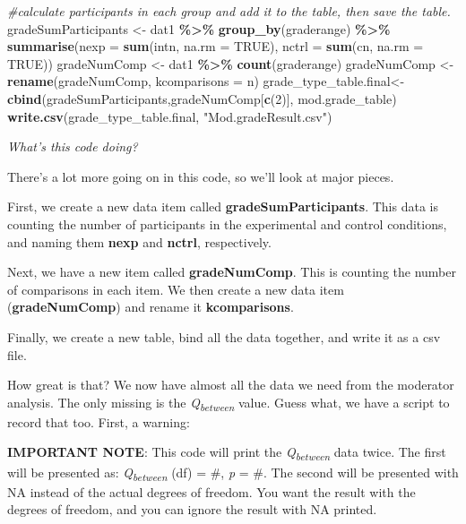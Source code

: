 \documentclass[
]{book}
\newenvironment{Shaded}{\begin{snugshade}}{\end{snugshade}}
\newcommand{\AttributeTok}[1]{\textcolor[rgb]{0.13,0.29,0.53}{#1}}
\newcommand{\CommentTok}[1]{\textcolor[rgb]{0.56,0.35,0.01}{\textit{#1}}}
\newcommand{\ConstantTok}[1]{\textcolor[rgb]{0.56,0.35,0.01}{#1}}
\newcommand{\DecValTok}[1]{\textcolor[rgb]{0.00,0.00,0.81}{#1}}
\newcommand{\FunctionTok}[1]{\textcolor[rgb]{0.13,0.29,0.53}{\textbf{#1}}}
\newcommand{\NormalTok}[1]{#1}
\newcommand{\OtherTok}[1]{\textcolor[rgb]{0.56,0.35,0.01}{#1}}
\newcommand{\SpecialCharTok}[1]{\textcolor[rgb]{0.81,0.36,0.00}{\textbf{#1}}}
\newcommand{\StringTok}[1]{\textcolor[rgb]{0.31,0.60,0.02}{#1}}
\begin{document}
\begin{Shaded}
\begin{Highlighting}[]
\CommentTok{\#calculate participants in each group and add it to the table, then save the table.}
\NormalTok{gradeSumParticipants }\OtherTok{\textless{}{-}}\NormalTok{ dat1 }\SpecialCharTok{\%\textgreater{}\%}
  \FunctionTok{group\_by}\NormalTok{(graderange) }\SpecialCharTok{\%\textgreater{}\%}
  \FunctionTok{summarise}\NormalTok{(}\AttributeTok{nexp =} \FunctionTok{sum}\NormalTok{(intn, }\AttributeTok{na.rm =} \ConstantTok{TRUE}\NormalTok{),}
            \AttributeTok{nctrl =} \FunctionTok{sum}\NormalTok{(cn, }\AttributeTok{na.rm =} \ConstantTok{TRUE}\NormalTok{))}
\NormalTok{gradeNumComp }\OtherTok{\textless{}{-}}\NormalTok{ dat1 }\SpecialCharTok{\%\textgreater{}\%}
  \FunctionTok{count}\NormalTok{(graderange)}
\NormalTok{gradeNumComp }\OtherTok{\textless{}{-}} \FunctionTok{rename}\NormalTok{(gradeNumComp, }\AttributeTok{kcomparisons =}\NormalTok{ n)}
\NormalTok{grade\_type\_table.final}\OtherTok{\textless{}{-}} \FunctionTok{cbind}\NormalTok{(gradeSumParticipants,gradeNumComp[}\FunctionTok{c}\NormalTok{(}\DecValTok{2}\NormalTok{)], mod.grade\_table) }
\FunctionTok{write.csv}\NormalTok{(grade\_type\_table.final, }\StringTok{"Mod.gradeResult.csv"}\NormalTok{)}
\end{Highlighting}
\end{Shaded}

\emph{What's this code doing?}

There's a lot more going on in this code, so we'll look at major pieces.

First, we create a new data item called \textbf{gradeSumParticipants}. This data is counting the number of participants in the experimental and control conditions, and naming them \textbf{nexp} and \textbf{nctrl}, respectively.

Next, we have a new item called \textbf{gradeNumComp}. This is counting the number of comparisons in each item. We then create a new data item (\textbf{gradeNumComp}) and rename it \textbf{kcomparisons}.

Finally, we create a new table, bind all the data together, and write it as a csv file.

How great is that? We now have almost all the data we need from the moderator analysis. The only missing is the \emph{Q\textsubscript{between}} value. Guess what, we have a script to record that too. First, a warning:

\textbf{IMPORTANT NOTE}: This code will print the \emph{Q\textsubscript{between}} data twice. The first will be presented as: \emph{Q\textsubscript{between}} (df) = \#, \emph{p} = \#. The second will be presented with NA instead of the actual degrees of freedom. You want the result with the degrees of freedom, and you can ignore the result with NA printed.
\end{document}
